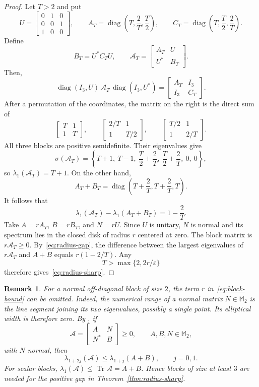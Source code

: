 \documentclass[11pt]{amsart}
\numberwithin{equation}{section}
\newtheorem{remark}[theorem]{Remark}
\newcommand{\Tr}{\operatorname{Tr}}
\newcommand{\diag}{\operatorname{diag}}
\newcommand{\spec}{\sigma}
\begin{document}
\begin{proof}
Let $T>2$ and put
\[
 U=\begin{bmatrix}0&1&0\\0&0&1\\1&0&0\end{bmatrix},
 \qquad
 A_T=\diag\left(T,\frac2T,\frac T2\right),
 \qquad
 C_T=\diag\left(T,\frac T2,\frac2T\right).
\]
Define
\[
 B_T=U^*C_TU,
 \qquad
 \mathcal A_T=\begin{bmatrix}A_T&U\\U^*&B_T\end{bmatrix}.
\]
Then,
\[
 \diag(I_3,U)\,\mathcal A_T\,\diag(I_3,U^*)
 =\begin{bmatrix}A_T&I_3\\I_3&C_T\end{bmatrix}.
\]
After a permutation of the coordinates, the matrix on the right is the direct sum of
\[
 \begin{bmatrix}T&1\\1&T\end{bmatrix},
 \qquad
 \begin{bmatrix}2/T&1\\1&T/2\end{bmatrix},
 \qquad
 \begin{bmatrix}T/2&1\\1&2/T\end{bmatrix}.
\]
All three blocks are positive semidefinite. Their eigenvalues give
\[
 \spec(\mathcal A_T)
 =\left\{T+1,\ T-1,\ \frac T2+\frac2T,\ \frac T2+\frac2T,\ 0,\ 0\right\},
\]
so $\lambda_1(\mathcal A_T)=T+1$. On the other hand,
\[
 A_T+B_T=\diag\left(T+\frac2T,T+\frac2T,T\right).
\]
It follows that
\begin{equation}\label{eq:radius-gap}
 \lambda_1(\mathcal A_T)-\lambda_1(A_T+B_T)=1-\frac2T.
\end{equation}
Take $A=rA_T$, $B=rB_T$, and $N=rU$. Since $U$ is unitary, $N$ is normal and its spectrum lies in the closed disk of radius $r$ centered at zero. The block matrix is $r\mathcal A_T\geq0$. By~\eqref{eq:radius-gap}, the difference between the largest eigenvalues of $r\mathcal A_T$ and $A+B$ equals $r(1-2/T)$. Any
\[
 T>\max\{2,2r/\varepsilon\}
\]
therefore gives~\eqref{eq:radius-sharp}.
\end{proof}


\begin{remark}\label{rem:two-by-two-blocks}
For a normal off-diagonal block of size $2$, the term $r$
in~\eqref{eq:block-bound} can be omitted.
Indeed, the numerical range of a normal matrix $N\in\mathbb M_2$
is the line segment joining its two eigenvalues, possibly a single point.
Its elliptical width is therefore zero. By
\cite[Theorem~2.1 and the discussion following Corollary~3.1]{BourinLee2022},
if
\[
 \mathcal A=\begin{bmatrix}A&N\\N^*&B\end{bmatrix}\geq0,
 \qquad A,B,N\in\mathbb M_2,
\]
with $N$ normal, then
\[
 \lambda_{1+2j}(\mathcal A)\leq\lambda_{1+j}(A+B),
 \qquad j=0,1.
\]
For scalar blocks, $\lambda_1(\mathcal A)\leq\Tr\mathcal A=A+B$.
Hence blocks of size at least $3$ are needed for the positive gap
in Theorem~\ref{thm:radius-sharp}.
\end{remark}
\end{document}
